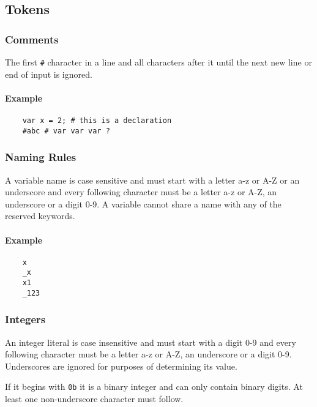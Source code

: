\subsection{Tokens}

\subsubsection{Comments}

The first \verb|#| character in a line and all characters after it until the next new line or end of input is ignored.

\paragraph{Example}

\begin{verbatim}
    var x = 2; # this is a declaration
    #abc # var var var ?
\end{verbatim}

\subsubsection{Naming Rules}

A variable name is case sensitive and must start with a letter a-z or A-Z or an underscore and every following character must be a letter a-z or A-Z, an underscore or a digit 0-9. A variable cannot share a name with any of the reserved keywords.

\paragraph{Example}

\begin{verbatim}
    x
    _x
    x1
    _123
\end{verbatim}

\subsubsection{Integers}

An integer literal is case insensitive and must start with a digit 0-9 and every following character must be a letter a-z or A-Z, an underscore or a digit 0-9. Underscores are ignored for purposes of determining its value.

If it begins with \verb|0b| it is a binary integer and can only contain binary digits. At least one non-underscore character must follow.

